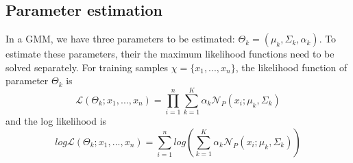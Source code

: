 \documentclass[12pt,a4paper]{article}
\begin{document}
\subsection{Parameter estimation}
In a GMM, we have three parameters to be estimated: $\Theta_k = (\mu_k, \Sigma_k,\alpha_k)$.
 To estimate these parameters, their the maximum likelihood functions need to be solved separately.
 For training samples $\chi = \{x_1, ...,x_n\}$, the likelihood function of parameter $\Theta_k$ is
\begin{equation}
    \mathcal{L}(\Theta_k; x_1,...,x_n) = \prod_{i = 1}^n  \sum_{k = 1}^K \alpha_k\mathcal{N}_P(x_i;\mu_k,\Sigma_k)
\end{equation}
and the log likelihood is 
\begin{equation}
    log \mathcal{L}(\Theta_k; x_1,...,x_n) = \sum_{i = 1}^n log (\sum_{k = 1}^K \alpha_k\mathcal{N}_P(x_i;\mu_k,\Sigma_k))
\end{equation}
\end{document}
